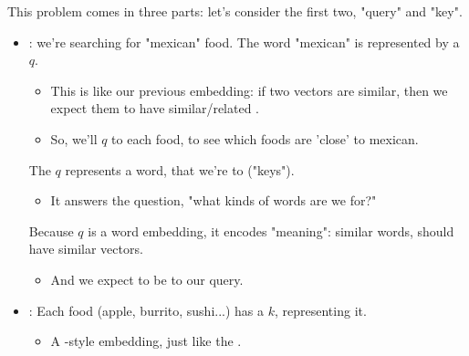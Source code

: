         \phantom{}

        This problem comes in three parts: let's consider the first two, "query" and "key".

        \begin{itemize}
            \item {}: we're searching for "mexican" food. The word "mexican" is represented by a  $q$. 
            
            \begin{itemize}
                \item This is like our previous  embedding: if two vectors are similar, then we expect them to have similar/related .
                \item So, we'll  $q$ to each food, to see which foods are 'close' to mexican.\\
            \end{itemize}

            \begin{definition}
                The  $q$ represents a word, that we're  to  ("keys").

                \begin{itemize}
                    \item It answers the question, "what kinds of words are we  for?" 
                \end{itemize}

                Because $q$ is a word embedding, it encodes "meaning": similar words, should have similar vectors.
                
                \begin{itemize}
                    \item And we expect  to be  to our query.
                \end{itemize} 
            \end{definition}

            \phantom{}

            \item {}: Each food (apple, burrito, sushi...) has a  $k$, representing it. 
            
            \begin{itemize}
                \item A -style embedding, just like the .


\end{itemize}
\end{itemize}
